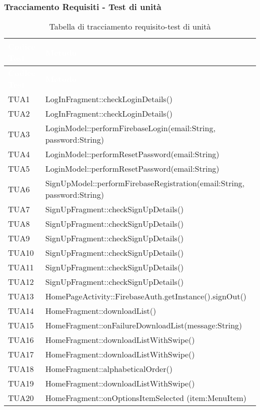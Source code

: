 \subsubsection{Tracciamento Requisiti - Test di unità}
{
	\renewcommand{\arraystretch}{1.5}
	\centering
	\begin{longtable}{C{2cm} C{12cm}}
		\caption{Tabella di tracciamento requisito-test di unità}\\
		\textcolor{white}{\textbf{Codice Test}} & \textcolor{white}{\textbf{Metodo}}\\	
		\endfirsthead
		\textcolor{white}{\textbf{Codice Test}} & \textcolor{white}{\textbf{Metodo}}\\	
		\endhead
		TUA1 & LogInFragment::checkLoginDetails()\\
		TUA2 & LogInFragment::checkLoginDetails()\\
		TUA3 & LoginModel::performFirebaseLogin(email:String, password:String)\\
		TUA4 & LoginModel::performResetPassword(email:String)\\
		TUA5 & LoginModel::performResetPassword(email:String)\\
		TUA6 & SignUpModel::performFirebaseRegistration(email:String, password:String)\\
		TUA7 & SignUpFragment::checkSignUpDetails()\\
		TUA8 & SignUpFragment::checkSignUpDetails()\\
		TUA9 & SignUpFragment::checkSignUpDetails()\\
		TUA10 & SignUpFragment::checkSignUpDetails()\\
		TUA11 & SignUpFragment::checkSignUpDetails()\\
		TUA12 & SignUpFragment::checkSignUpDetails()\\
		TUA13 & HomePageActivity::FirebaseAuth.getInstance().signOut()\\
		TUA14 & HomeFragment::downloadList()\\
		TUA15 & HomeFragment::onFailureDownloadList(message:String)\\
		TUA16 & HomeFragment::downloadListWithSwipe()\\
		TUA17 & HomeFragment::downloadListWithSwipe()\\
		TUA18 & HomeFragment::alphabeticalOrder()\\
		TUA19 & HomeFragment::downloadListWithSwipe()\\
		TUA20 & HomeFragment::onOptionsItemSelected (item:MenuItem)\\

\end{longtable}}
